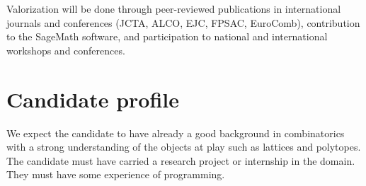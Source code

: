 \documentclass[a4paper,12pt]{article}
\begin{document}
Valorization will be done through peer-reviewed publications in international journals and conferences (JCTA, ALCO, EJC, FPSAC, EuroComb), contribution to the SageMath software, and participation to national and international workshops and conferences.

\section{Candidate profile}

We expect the candidate to have already a good background in combinatorics with a strong understanding of the objects at play such as lattices and polytopes. The candidate must have carried a research project or internship in the domain. They must have some experience of programming.


\small
\renewcommand{\refname}{\normalsize Bibliography}

\normalsize
\end{document}
